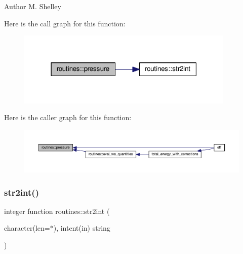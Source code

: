 \begin{DoxyAuthor}{Author}
M. Shelley 
\end{DoxyAuthor}
Here is the call graph for this function\+:
\nopagebreak
\begin{figure}[H]
\begin{center}
\leavevmode
\includegraphics[width=295pt]{namespaceroutines_a383e2bf5a1fa37fbf95dd5f6ddbcc6be_cgraph}
\end{center}
\end{figure}
Here is the caller graph for this function\+:
\nopagebreak
\begin{figure}[H]
\begin{center}
\leavevmode
\includegraphics[width=350pt]{namespaceroutines_a383e2bf5a1fa37fbf95dd5f6ddbcc6be_icgraph}
\end{center}
\end{figure}
\mbox{\label{namespaceroutines_a8146fb4359e556bad19f882b8aabfc4b}} 
\subsubsection{\texorpdfstring{str2int()}{str2int()}}
{\footnotesize\ttfamily integer function routines\+::str2int (\begin{DoxyParamCaption}\item[{character(len=$\ast$), intent(in)}]{string }\end{DoxyParamCaption})}

